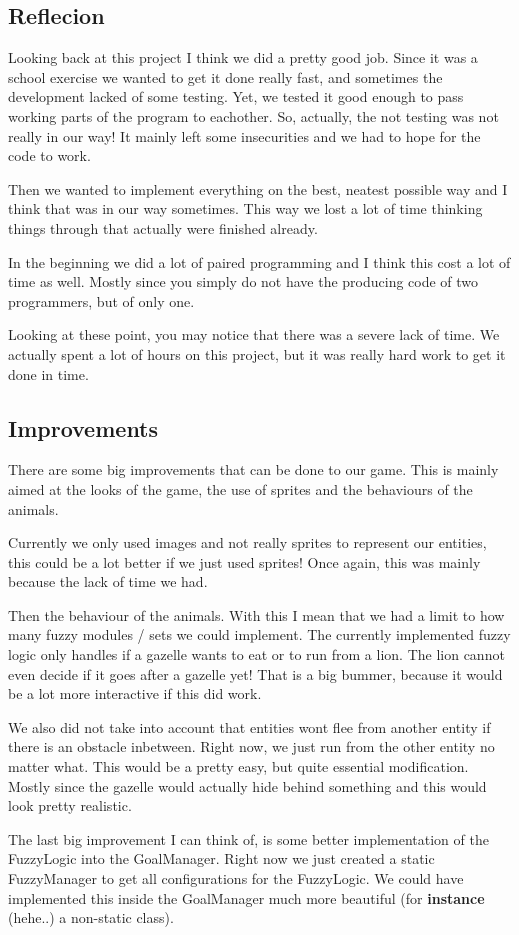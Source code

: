 \subsection[Reflection on the end result]{Reflecion}\label{subsec:reflection}
Looking back at this project I think we did a pretty good job.
Since it was a school exercise we wanted to get it done really fast, and sometimes the development lacked of some testing.
Yet, we tested it good enough to pass working parts of the program to eachother.
So, actually, the not testing was not really in our way!
It mainly left some insecurities and we had to hope for the code to work.

Then we wanted to implement everything on the best, neatest possible way and I think that was in our way sometimes.
This way we lost a lot of time thinking things through that actually were finished already.

In the beginning we did a lot of paired programming and I think this cost a lot of time as well.
Mostly since you simply do not have the producing code of two programmers, but of only one.

Looking at these point, you may notice that there was a severe lack of time.
We actually spent a lot of hours on this project, but it was really hard work to get it done in time.

\subsection[Improvements of our project]{Improvements}\label{subsec:improvements}
There are some big improvements that can be done to our game.
This is mainly aimed at the looks of the game, the use of sprites and the behaviours of the animals.

Currently we only used images and not really sprites to represent our entities, this could be a lot better if we just used sprites!
Once again, this was mainly because the lack of time we had.

Then the behaviour of the animals.
With this I mean that we had a limit to how many fuzzy modules / sets we could implement.
The currently implemented fuzzy logic only handles if a gazelle wants to eat or to run from a lion.
The lion cannot even decide if it goes after a gazelle yet!
That is a big bummer, because it would be a lot more interactive if this did work.

We also did not take into account that entities wont flee from another entity if there is an obstacle inbetween.
Right now, we just run from the other entity no matter what.
This would be a pretty easy, but quite essential modification.
Mostly since the gazelle would actually hide behind something and this would look pretty realistic.

The last big improvement I can think of, is some better implementation of the FuzzyLogic into the GoalManager.
Right now we just created a static FuzzyManager to get all configurations for the FuzzyLogic.
We could have implemented this inside the GoalManager much more beautiful (for \textbf{instance} (hehe..) a non-static class).
